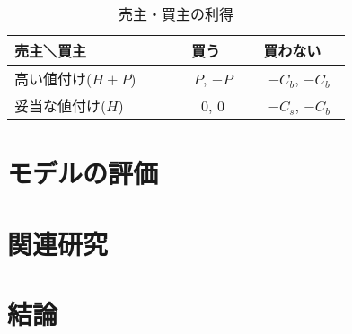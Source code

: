 \documentclass[a4paper,11pt]{jlreq}
\begin{document}
\begin{table}
\begin{center}
\caption{売主・買主の利得}
\label{ritoku}
\begin{tabular}{l|cc}
売主＼買主 & 買う & 買わない \\ \hline
高い値付け($H+P$)　　 & 　$P$,  $-P$ & 　$-C_b$,  $-C_b$　 \\
妥当な値付け($H$)　　 & 　0, 0 & 　$-C_s$,  $-C_b$　
\end{tabular}
\end{center}
\end{table}%



\section{モデルの評価}
\section{関連研究}
\section{結論}



\end{document}
